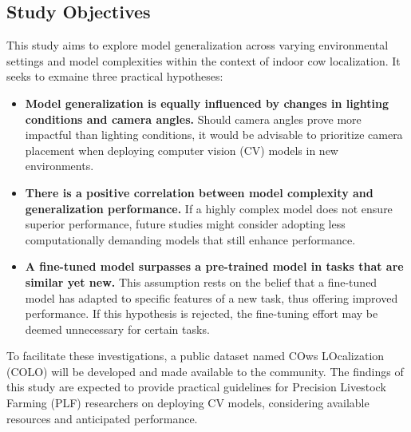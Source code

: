 \subsection*{Study Objectives}

This study aims to explore model generalization across varying environmental settings and model complexities within the context of indoor cow localization. It seeks to exmaine three practical hypotheses:

\begin{itemize}
    \item \textbf{Model generalization is equally influenced by changes in lighting conditions and camera angles.} Should camera angles prove more impactful than lighting conditions, it would be advisable to prioritize camera placement when deploying computer vision (CV) models in new environments.
    \item \textbf{There is a positive correlation between model complexity and generalization performance.} If a highly complex model does not ensure superior performance, future studies might consider adopting less computationally demanding models that still enhance performance.
    \item \textbf{A fine-tuned model surpasses a pre-trained model in tasks that are similar yet new.} This assumption rests on the belief that a fine-tuned model has adapted to specific features of a new task, thus offering improved performance. If this hypothesis is rejected, the fine-tuning effort may be deemed unnecessary for certain tasks.
\end{itemize}

To facilitate these investigations, a public dataset named COws LOcalization (COLO) will be developed and made available to the community. The findings of this study are expected to provide practical guidelines for Precision Livestock Farming (PLF) researchers on deploying CV models, considering available resources and anticipated performance.
